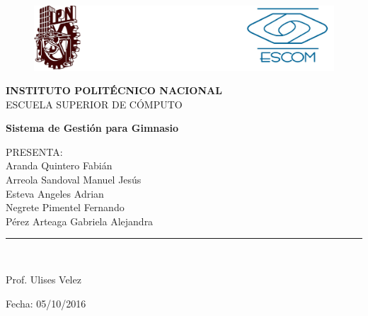 \documentclass[a4paper, openany, 12pt]{book}
\begin{document}
\begin{titlepage}

\begin{center}
\vspace*{-1in}
\begin{figure}[htb]
\begin{center}
\includegraphics[width=15cm]{logo3}
\end{center}
\end{figure}

\textbf{INSTITUTO POLIT\'ECNICO NACIONAL}\\
\vspace*{0.15in}
ESCUELA SUPERIOR DE C\'OMPUTO\\
\vspace*{0.6in}
\begin{large}
\end{large}
\vspace*{0.2in}
\begin{Large}
\textbf{Sistema de Gesti\'on para Gimnasio} \\
\end{Large}
\vspace*{0.3in}
\begin{large}
\vspace*{0.5in}
PRESENTA:\\
Aranda Quintero Fabi\'an \\
Arreola Sandoval Manuel Jes\'us \\
Esteva Angeles Adrian \\
Negrete Pimentel Fernando \\
P\'erez Arteaga Gabriela Alejandra
\end{large}
\vspace*{0.3in}
\rule{80mm}{0.1mm}\\
\vspace*{0.1in}
\begin{large}
Prof. Ulises Velez\\
\end{large}
\vspace*{0.3in}
\begin{large}
Fecha: 05/10/2016
\end{large}
\end{center}

\end{titlepage}
\newpage
$\ $
\thispagestyle{empty} %
\tableofcontents		%




\end{document}
